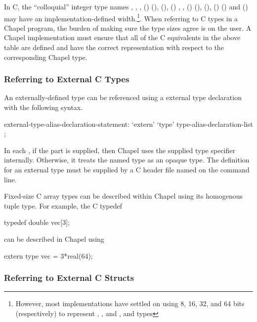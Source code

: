 In C, the ``colloquial'' integer type names , , , () 
(),  (),
() , ,
()  (),  (), ()  () and  () may have an
implementation-defined width.\footnote{However, most implementations have settled
on using 8, 16, 32, and 64 bits (respectively) to
represent , ,  and , and  types}.  When referring to C types in a Chapel program, the burden of
making sure the type sizes agree is on the user.  A Chapel implementation must
ensure that all of the C equivalents in the above table are defined and have the
correct representation with respect to the corresponding Chapel type.

\subsubsection{Referring to External C Types}
\label{Referring_to_External_C_Types}

An externally-defined type can be referenced using a external type declaration
with the following syntax.
\begin{syntax}
external-type-alias-declaration-statement:
  `extern' `type' type-alias-declaration-list ;
\end{syntax}

In each , if the  part is
supplied, then Chapel uses the supplied type specifier internally.  Otherwise,
it treats the named type as an opaque type.  The definition for an external type
must be supplied by a C header file named on the  command line.

Fixed-size C array types can be described within Chapel using its
homogenous tuple type.  For example, the C typedef
\begin{chapel}
typedef double vec[3];
\end{chapel}
can be described in Chapel using
\begin{chapel}
extern type vec = 3*real(64);
\end{chapel}


\subsubsection{Referring to External C Structs}
\label{Referring_to_External_C_Structs}

